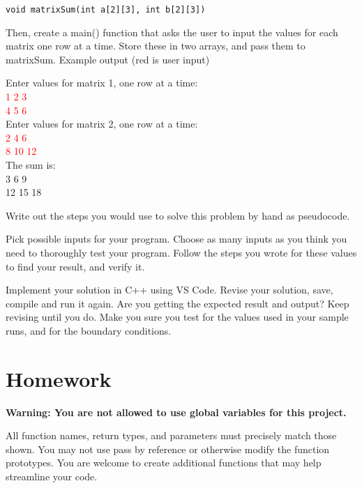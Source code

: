 \texttt{void matrixSum(int a[2][3], int b[2][3])}

Then, create a main() function that asks the user to input the values for each matrix one row at a time. Store these in two arrays, and pass them to matrixSum. Example output (red is user input)

\begin{sample}
Enter values for matrix 1, one row at a time:\\
\textcolor{red}{1 2 3}\\
\textcolor{red}{4 5 6}\\
Enter values for matrix 2, one row at a time:\\
\textcolor{red}{2 4 6}\\
\textcolor{red}{8 10 12}\\
The sum is:\\
3 6 9\\
12 15 18\\
\end{sample}

\begin{multipart}
    Write out the steps you would use to solve this problem by hand as pseudocode. 
\end{multipart}

\newpage

\begin{multipart}
Pick possible inputs for your program. Choose as many inputs as you think you need to thoroughly test your program. Follow the steps you wrote for these values to find your result, and verify it.
\end{multipart}

\vspace{14cm}

\begin{multipart}
Implement your solution in C++ using VS Code. Revise your solution, save, compile and run it again. Are you getting the expected result and output? Keep revising until you do. Make you sure you test for the values used in your sample runs, and for the boundary conditions.
\end{multipart}

\section{Homework}

\textbf{Warning: You are not allowed to use global variables for this project.}

All function names, return types, and parameters must precisely match those shown. You may not use pass by reference or otherwise modify the function prototypes. You are welcome to create additional functions that may help streamline your code. 

